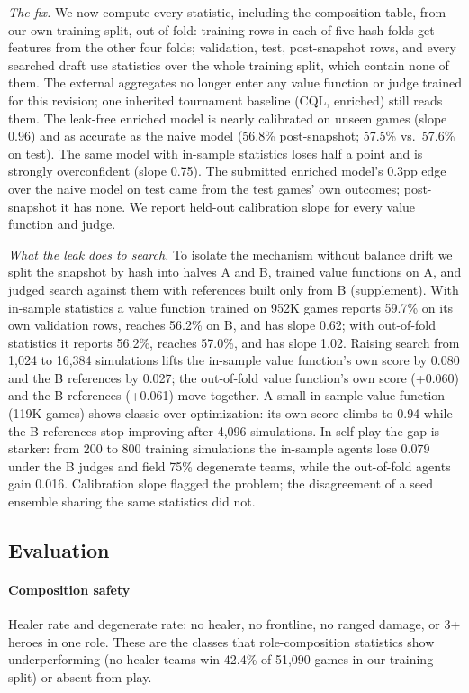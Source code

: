 \documentclass[journal]{IEEEtran}
\begin{document}
\textit{The fix.} We now compute every statistic, including the composition table, from our own training split, out of fold: training rows in each of five hash folds get features from the other four folds; validation, test, post-snapshot rows, and every searched draft use statistics over the whole training split, which contain none of them. The external aggregates no longer enter any value function or judge trained for this revision; one inherited tournament baseline (CQL, enriched) still reads them. The leak-free enriched model is nearly calibrated on unseen games (slope 0.96) and as accurate as the naive model (56.8\% post-snapshot; 57.5\% vs.\ 57.6\% on test). The same model with in-sample statistics loses half a point and is strongly overconfident (slope 0.75). The submitted enriched model's 0.3pp edge over the naive model on test came from the test games' own outcomes; post-snapshot it has none. We report held-out calibration slope for every value function and judge.

\textit{What the leak does to search.} To isolate the mechanism without balance drift we split the snapshot by hash into halves A and B, trained value functions on A, and judged search against them with references built only from B (supplement). With in-sample statistics a value function trained on 952K games reports 59.7\% on its own validation rows, reaches 56.2\% on B, and has slope 0.62; with out-of-fold statistics it reports 56.2\%, reaches 57.0\%, and has slope 1.02. Raising search from 1,024 to 16,384 simulations lifts the in-sample value function's own score by 0.080 and the B references by 0.027; the out-of-fold value function's own score (+0.060) and the B references (+0.061) move together. A small in-sample value function (119K games) shows classic over-optimization: its own score climbs to 0.94 while the B references stop improving after 4,096 simulations. In self-play the gap is starker: from 200 to 800 training simulations the in-sample agents lose 0.079 under the B judges and field 75\% degenerate teams, while the out-of-fold agents gain 0.016. Calibration slope flagged the problem; the disagreement of a seed ensemble sharing the same statistics did not.

\subsection{Evaluation}
\label{sec:eval}

\paragraph{Composition safety} Healer rate and degenerate rate: no healer, no frontline, no ranged damage, or 3+ heroes in one role. These are the classes that role-composition statistics show underperforming (no-healer teams win 42.4\% of 51,090 games in our training split) or absent from play.
\end{document}
